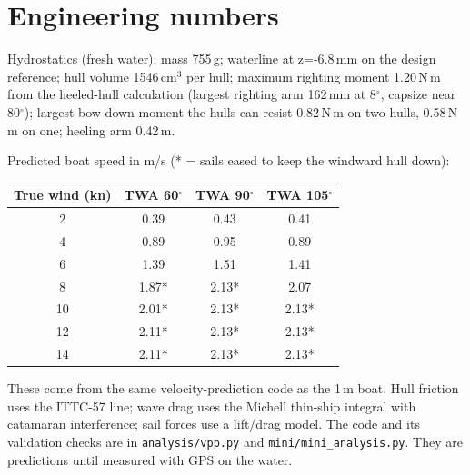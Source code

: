 \documentclass[11pt]{article}
\begin{document}
\appendix
\section{Engineering numbers}
Hydrostatics (fresh water): mass 755\,g; waterline at z=-6.8\,mm on the design reference; hull volume 1546\,cm$^3$ per hull; maximum righting moment 1.20\,N\,m from the heeled-hull calculation (largest righting arm 162\,mm at 8$^\circ$, capsize near 80$^\circ$); largest bow-down moment the hulls can resist 0.82\,N\,m on two hulls, 0.58\,N\,m on one; heeling arm 0.42\,m.

\noindent Predicted boat speed in m/s (* = sails eased to keep the windward hull down):
\begin{center}
\begin{tabular}{cccc}
\toprule
True wind (kn) & TWA 60$^\circ$ & TWA 90$^\circ$ & TWA 105$^\circ$ \\
\midrule
2 & 0.39 & 0.43 & 0.41 \\
4 & 0.89 & 0.95 & 0.89 \\
6 & 1.39 & 1.51 & 1.41 \\
8 & 1.87* & 2.13* & 2.07 \\
10 & 2.01* & 2.13* & 2.13* \\
12 & 2.11* & 2.13* & 2.13* \\
14 & 2.11* & 2.13* & 2.13* \\
\bottomrule
\end{tabular}
\end{center}
These come from the same velocity-prediction code as the 1\,m boat. Hull friction uses the ITTC-57 line; wave drag uses the Michell thin-ship integral with catamaran interference; sail forces use a lift/drag model. The code and its validation checks are in \texttt{analysis/vpp.py} and \texttt{mini/mini\_analysis.py}. They are predictions until measured with GPS on the water.
\end{document}
